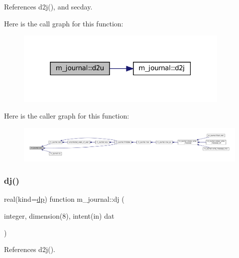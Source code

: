 References d2j(), and secday.

Here is the call graph for this function\+:\nopagebreak
\begin{figure}[H]
\begin{center}
\leavevmode
\includegraphics[width=291pt]{namespacem__journal_a9cd7f892071e8ddfde7e45fea077c3ce_cgraph}
\end{center}
\end{figure}
Here is the caller graph for this function\+:\nopagebreak
\begin{figure}[H]
\begin{center}
\leavevmode
\includegraphics[width=350pt]{namespacem__journal_a9cd7f892071e8ddfde7e45fea077c3ce_icgraph}
\end{center}
\end{figure}
\mbox{\label{namespacem__journal_a649265e689819cb284a82eb80c49df49}} 
\subsubsection{\texorpdfstring{dj()}{dj()}}
{\footnotesize\ttfamily real(kind=\mbox{\hyperlink{namespacem__journal_aaae0522a70bb76a85ea800670d5fec5f}{dp}}) function m\+\_\+journal\+::dj (\begin{DoxyParamCaption}\item[{integer, dimension(8), intent(in)}]{dat }\end{DoxyParamCaption})\hspace{0.3cm}{\ttfamily [private]}}



References d2j().

